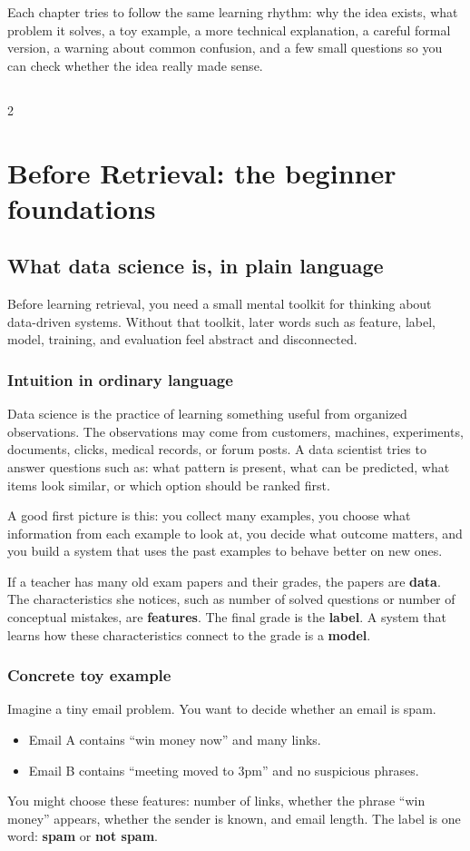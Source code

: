 \documentclass[11pt,oneside]{report}
\makeatletter
\newcommand{\term}[1]{\textbf{#1}}
\newcommand{\chapterpattern}{%
\begin{rememberbox}
Each chapter tries to follow the same learning rhythm: why the idea exists, what problem it solves, a toy example, a more technical explanation, a careful formal version, a warning about common confusion, and a few small questions so you can check whether the idea really made sense.
\end{rememberbox}}
\newcommand{\compacttableofcontents}{%
  \chapter*{\contentsname}
  \@mkboth{\MakeUppercase\contentsname}{\MakeUppercase\contentsname}%
  \begingroup
  \setlength{\parskip}{0pt}%
  \setlength{\columnsep}{1em}%
  \footnotesize
  \setstretch{0.9}%
  \begin{multicols}{2}
  \@starttoc{toc}%
  \end{multicols}
  \endgroup
}
\makeatother
\begin{document}
\chapterpattern

\compacttableofcontents

\clearpage
{}
\part[Foundations]{Before Retrieval: the beginner foundations}
\chapter[Data Science in Plain Language]{What data science is, in plain language}

\begin{purposebox}
Before learning retrieval, you need a small mental toolkit for thinking about data-driven systems. Without that toolkit, later words such as feature, label, model, training, and evaluation feel abstract and disconnected.
\end{purposebox}

\section*{Intuition in ordinary language}
Data science is the practice of learning something useful from organized observations. The observations may come from customers, machines, experiments, documents, clicks, medical records, or forum posts. A data scientist tries to answer questions such as: what pattern is present, what can be predicted, what items look similar, or which option should be ranked first.

A good first picture is this: you collect many examples, you choose what information from each example to look at, you decide what outcome matters, and you build a system that uses the past examples to behave better on new ones.

\begin{intuitionbox}
If a teacher has many old exam papers and their grades, the papers are \term{data}. The characteristics she notices, such as number of solved questions or number of conceptual mistakes, are \term{features}. The final grade is the \term{label}. A system that learns how these characteristics connect to the grade is a \term{model}.
\end{intuitionbox}

\section*{Concrete toy example}
Imagine a tiny email problem. You want to decide whether an email is spam.
\begin{itemize}
\item Email A contains ``win money now'' and many links.
\item Email B contains ``meeting moved to 3pm'' and no suspicious phrases.
\end{itemize}
You might choose these features: number of links, whether the phrase ``win money'' appears, whether the sender is known, and email length. The label is one word: \term{spam} or \term{not spam}.
\end{document}
